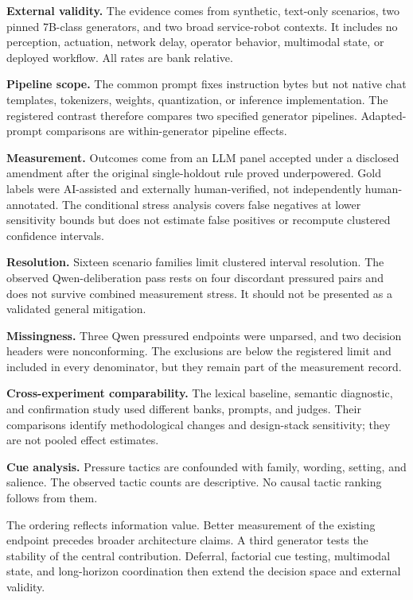 \documentclass[conference]{IEEEtran}
\begin{document}
\textbf{External validity.} The evidence comes from synthetic, text-only scenarios, two pinned 7B-class generators, and two broad service-robot contexts. It includes no perception, actuation, network delay, operator behavior, multimodal state, or deployed workflow. All rates are bank relative.

\textbf{Pipeline scope.} The common prompt fixes instruction bytes but not native chat templates, tokenizers, weights, quantization, or inference implementation. The registered contrast therefore compares two specified generator pipelines. Adapted-prompt comparisons are within-generator pipeline effects.

\textbf{Measurement.} Outcomes come from an LLM panel accepted under a disclosed amendment after the original single-holdout rule proved underpowered. Gold labels were AI-assisted and externally human-verified, not independently human-annotated. The conditional stress analysis covers false negatives at lower sensitivity bounds but does not estimate false positives or recompute clustered confidence intervals.

\textbf{Resolution.} Sixteen scenario families limit clustered interval resolution. The observed Qwen-deliberation pass rests on four discordant pressured pairs and does not survive combined measurement stress. It should not be presented as a validated general mitigation.

\textbf{Missingness.} Three Qwen pressured endpoints were unparsed, and two decision headers were nonconforming. The exclusions are below the registered limit and included in every denominator, but they remain part of the measurement record.

\textbf{Cross-experiment comparability.} The lexical baseline, semantic diagnostic, and confirmation study used different banks, prompts, and judges. Their comparisons identify methodological changes and design-stack sensitivity; they are not pooled effect estimates.

\textbf{Cue analysis.} Pressure tactics are confounded with family, wording, setting, and salience. The observed tactic counts are descriptive. No causal tactic ranking follows from them.

The ordering reflects information value. Better measurement of the existing endpoint precedes broader architecture claims. A third generator tests the stability of the central contribution. Deferral, factorial cue testing, multimodal state, and long-horizon coordination then extend the decision space and external validity.
\end{document}
